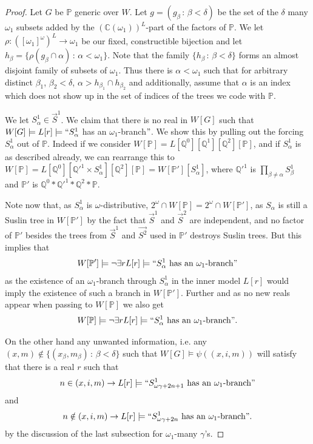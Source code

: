 \documentclass[a4paper,11pt]{article}
\newcommand{\forceP}{\mathbb{P}}
\newcommand{\forceQ}{\mathbb{Q}}
\begin{document}
\begin{proof}
Let $G$ be $\forceP$ generic over $W$. Let $g= (g_{\beta} \, : \, {\beta} < \delta)$ be the set of the $\delta$ many $\omega_1$ subsets added by the $(\mathbb{C} (\omega_1))^L$-part of the factors of $\forceP$. We let $\rho : ([\omega_1]^{\omega})^L \rightarrow \omega_1$ be our fixed, constructible bijection and let $h_{\beta}= \{ \rho (g_{\beta} \cap \alpha) \, : \, \alpha < \omega_1\}$. Note that the family $\{h_{\beta} \,: \, \beta < \delta \}$ forms an almost disjoint family of subsets of $\omega_1$. Thus there is $\alpha < \omega_1$ such that for arbitrary distinct $\beta_1$, $\beta_2 < \delta$,  $\alpha> h_{\beta_1}\cap h_{\beta_2}$  and additionally, assume that $\alpha$ is an index which does not show up in the set of indices of the trees we code with $\forceP$.

We let $S^1_{\alpha} \in \vec{S}^1$. We claim that there is no real in $W[G]$ such that $W[G] \models L[r] \models ``S^1_{\alpha}$ has an $\omega_1$-branch$"$.
We show this by pulling out the forcing $S^1_{\alpha}$ out of $\forceP$. 
Indeed if we consider $W[\forceP]=L[\forceQ^0] [\forceQ^1][\forceQ^2][\forceP]$, and if $S^1_{\alpha}$ is as described already,
we can rearrange this to $W[\forceP]= L [\forceQ^0] [\forceQ'^1 \times S^1_{\alpha} ] [ \forceQ^2] [\forceP] = W[\forceP'] [S^1_{\alpha} ]$, where $\forceQ'^1$ is $\prod_{\beta \ne \alpha}  S^1_{\beta}$ and $\forceP'$ is $\forceQ^0 \ast \forceQ'^1 \ast \forceQ^2 \ast \forceP$.

Note now that, as $S^1_{\alpha}$ is $\omega$-distributive, $2^{\omega} \cap W[\forceP] = 2^{\omega} \cap W[\forceP']$, as $S_{\alpha}$ is still a Suslin tree in $W[\forceP']$ by the fact that $\vec{S}^1$ and $\vec{S}^2$ are independent, and no factor of $\forceP'$ besides the trees from $\vec{S}^1$ and $\vec{S^2}$ used in $\forceP'$ destroys Suslin trees. But this implies that 
\[W[\forceP'] \models \lnot \exists r L[r] \models `` S^1_{\alpha} \text{ has an $\omega_1$-branch}" \]
as the existence of an $\omega_1$-branch through $S^1_{\alpha}$ in the inner model $L[r]$ would imply the existence of such a branch in $W[\forceP']$. Further
and as no new reals appear when passing to $W[\forceP]$ we also get 
\[W[\forceP] \models \lnot \exists r L[r] \models `` S^1_{\alpha} \text{ has an $\omega_1$-branch}". \]


On the other hand any unwanted information, i.e. any $(x,m) \notin \{(x_{\beta}, m_{\beta}) \, : \, \beta < \delta \}$ such that $W[G] \models \psi((x,i,m))$ will satisfy that there is a real $r$ such that
\[n \in (x,i,m) \rightarrow L[r] \models ``S^1_{\omega \gamma+2n+1} \text{ has an $\omega_1$-branch}" \]
and
\[ n \notin (x,i,m) \rightarrow L[r] \models ``S^1_{\omega \gamma+2n} \text{ has an $\omega_1$-branch}". \]
by the discussion of the last subsection  for $\omega_1$-many $\gamma$'s.


\end{proof}
\end{document}
